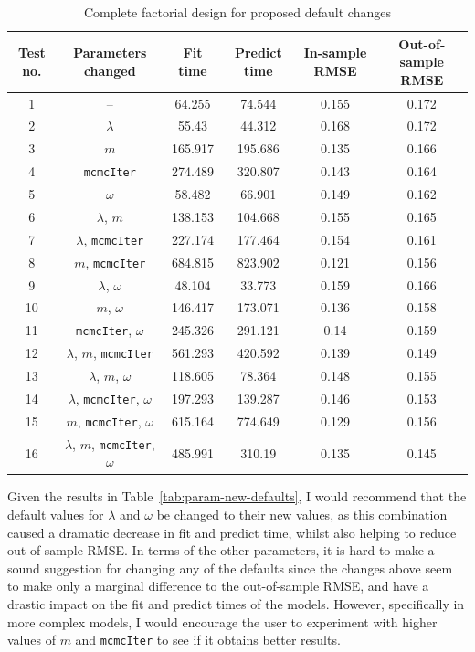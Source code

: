 \documentclass[10pt]{article}
\begin{document}
\begin{table}[t]
\centering
\begin{tabular}{|c|c|c|c|c|c|}
\hline
\textbf{Test no.} & \textbf{Parameters changed} & \textbf{Fit time} & \textbf{Predict time} & \textbf{In-sample RMSE} & \textbf{Out-of-sample RMSE}\\
\hline
1 & -- & 64.255 & 74.544 & 0.155 & 0.172 \\
\hline
2 & $\lambda$ & 55.43 & 44.312 & 0.168 & 0.172 \\
3 & $m$ & 165.917 & 195.686 & 0.135 & 0.166 \\
4 & \texttt{mcmcIter} & 274.489 & 320.807 & 0.143 & 0.164 \\
5 & $\omega$ & 58.482 & 66.901 & 0.149 & 0.162 \\
\hline
6 & $\lambda$, $m$ & 138.153 & 104.668 & 0.155 & 0.165 \\
7 & $\lambda$, \texttt{mcmcIter} & 227.174 & 177.464 & 0.154 & 0.161 \\
8 & $m$, \texttt{mcmcIter} & 684.815 & 823.902 & 0.121 & 0.156 \\
9 & $\lambda$, $\omega$ & 48.104 & 33.773 & 0.159 & 0.166 \\
10 & $m$, $\omega$ & 146.417 & 173.071 & 0.136 & 0.158 \\
11 & \texttt{mcmcIter}, $\omega$ & 245.326 & 291.121 & 0.14 & 0.159 \\
\hline
12 & $\lambda$, $m$, \texttt{mcmcIter} & 561.293 & 420.592 & 0.139 & 0.149 \\
13 & $\lambda$, $m$, $\omega$ & 118.605 & 78.364 & 0.148 & 0.155 \\
14 & $\lambda$, \texttt{mcmcIter}, $\omega$ & 197.293 & 139.287 & 0.146 & 0.153 \\
15 & $m$, \texttt{mcmcIter}, $\omega$ & 615.164 & 774.649 & 0.129 & 0.156 \\
\hline
16 & $\lambda$, $m$, \texttt{mcmcIter}, $\omega$ & 485.991 & 310.19 & 0.135 & 0.145 \\
\hline
\end{tabular}
\caption{Complete factorial design for proposed default changes}
\label{tab:factorial-design}
\end{table}
Given the results in Table~\ref{tab:param-new-defaults}, I would recommend that the default values for $\lambda$ and $\omega$ be changed to their new values, as this combination caused a dramatic decrease in fit and predict time, whilst also helping to reduce out-of-sample RMSE. In terms of the other parameters, it is hard to make a sound suggestion for changing any of the defaults since the changes above seem to make only a marginal difference to the out-of-sample RMSE, and have a drastic impact on the fit and predict times of the models. However, specifically in more complex models, I would encourage the user to experiment with higher values of $m$ and \texttt{mcmcIter} to see if it obtains better results.
\end{document}
